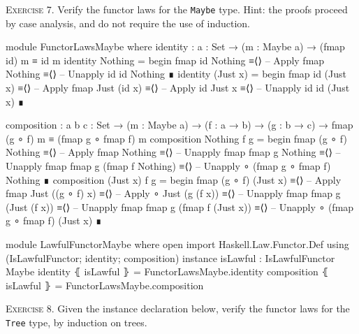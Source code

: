 \documentclass{article}
\begin{document}
\noindent
\textsc{Exercise 7.} Verify the functor laws for the \texttt{Maybe} type. Hint: the proofs proceed by case analysis, and do not require the use of induction.

\begin{code}
module FunctorLawsMaybe where
  identity : {a : Set} → (m : Maybe a) → (fmap id) m ≡ id m
  identity Nothing =
    begin
      fmap id Nothing
    ≡⟨⟩ -- Apply fmap
      Nothing
    ≡⟨⟩ -- Unapply id
      id Nothing
    ∎
  identity (Just x) =
    begin
      fmap id (Just x)
    ≡⟨⟩ -- Apply fmap
      Just (id x)
    ≡⟨⟩ -- Apply id
      Just x
    ≡⟨⟩ -- Unapply id
      id (Just x)
    ∎
\end{code}
\begin{code}
  composition : {a b c : Set}
    → (m : Maybe a) → (f : a → b) → (g : b → c)
    → fmap (g ∘ f) m ≡ (fmap g ∘ fmap f) m
  composition Nothing f g =
      begin
        fmap (g ∘ f) Nothing
      ≡⟨⟩ -- Apply fmap
        Nothing
      ≡⟨⟩ -- Unapply fmap
        fmap g Nothing
      ≡⟨⟩ -- Unapply fmap
        fmap g (fmap f Nothing)
      ≡⟨⟩ -- Unapply ∘
        (fmap g ∘ fmap f) Nothing
      ∎
  composition (Just x) f g =
    begin
      fmap (g ∘ f) (Just x)
    ≡⟨⟩ -- Apply fmap
      Just ((g ∘ f) x)
    ≡⟨⟩ -- Apply ∘
      Just (g (f x))
    ≡⟨⟩ -- Unapply fmap
      fmap g (Just (f x))
    ≡⟨⟩ -- Unapply fmap
      fmap g (fmap f (Just x))
    ≡⟨⟩ -- Unapply ∘
      (fmap g ∘ fmap f) (Just x)
    ∎
\end{code}
\begin{code}
module LawfulFunctorMaybe where
  open import Haskell.Law.Functor.Def
    using (IsLawfulFunctor; identity; composition)
  instance
    isLawful : IsLawfulFunctor Maybe
    identity ⦃ isLawful ⦄ = FunctorLawsMaybe.identity
    composition ⦃ isLawful ⦄ = FunctorLawsMaybe.composition
\end{code}

\noindent
\textsc{Exercise 8.} Given the instance declaration below, verify the functor laws for the \texttt{Tree} type, by induction on trees.
\end{document}
